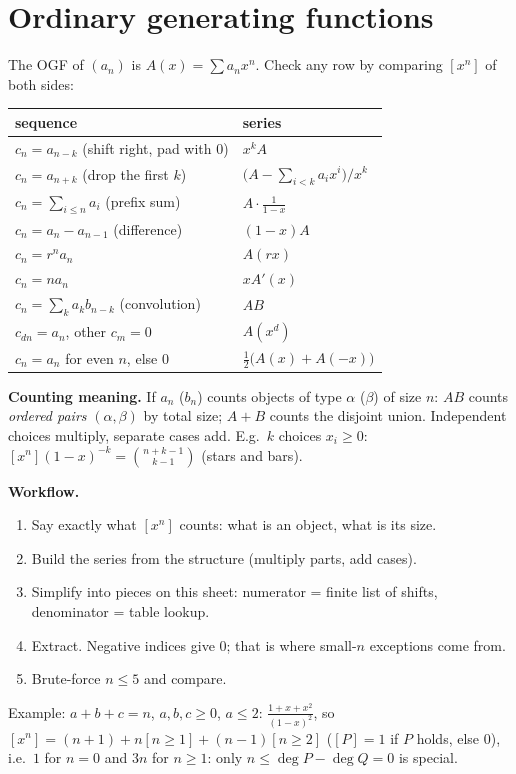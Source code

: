 \section{Ordinary generating functions}
	The OGF of $(a_n)$ is $A(x)=\sum a_nx^n$. Check any row by comparing $[x^n]$ of both sides:
	\begin{center}\small\renewcommand{\arraystretch}{1.3}
	\begin{tabular}{@{}l@{\ \ }l@{}}
	sequence & series \\ \hline
	$c_n=a_{n-k}$ (shift right, pad with $0$) & $x^kA$ \\
	$c_n=a_{n+k}$ (drop the first $k$) & $\big(A-\sum_{i<k}a_ix^i\big)/x^k$ \\
	$c_n=\sum_{i\le n}a_i$ (prefix sum) & $A\cdot\frac1{1-x}$ \\
	$c_n=a_n-a_{n-1}$ (difference) & $(1-x)A$ \\
	$c_n=r^na_n$ & $A(rx)$ \\
	$c_n=na_n$ & $xA'(x)$ \\
	$c_n=\sum_ka_kb_{n-k}$ (convolution) & $AB$ \\
	$c_{dn}=a_n$, other $c_m=0$ & $A(x^d)$ \\
	$c_n=a_n$ for even $n$, else $0$ & $\frac12\big(A(x)+A(-x)\big)$ \\
	\end{tabular}
	\end{center}
	\textbf{Counting meaning.} If $a_n$ ($b_n$) counts objects of type $\alpha$ ($\beta$) of size $n$: $AB$ counts \emph{ordered pairs} $(\alpha,\beta)$ by total size; $A+B$ counts the disjoint union. Independent choices multiply, separate cases add. E.g.\ $k$ choices $x_i\ge0$: $[x^n](1-x)^{-k}=\binom{n+k-1}{k-1}$ (stars and bars).

	\textbf{Workflow.}
	\begin{enumerate}[nosep,leftmargin=*]
	\item Say exactly what $[x^n]$ counts: what is an object, what is its size.
	\item Build the series from the structure (multiply parts, add cases).
	\item Simplify into pieces on this sheet: numerator = finite list of shifts, denominator = table lookup.
	\item Extract. Negative indices give $0$; that is where small-$n$ exceptions come from.
	\item Brute-force $n\le5$ and compare.
	\end{enumerate}
	Example: $a+b+c=n$, $a,b,c\ge0$, $a\le2$: $\frac{1+x+x^2}{(1-x)^2}$, so $[x^n]=(n+1)+n[n\ge1]+(n-1)[n\ge2]$ ($[P]=1$ if $P$ holds, else $0$), i.e.\ $1$ for $n=0$ and $3n$ for $n\ge1$: only $n\le\deg P-\deg Q=0$ is special.

